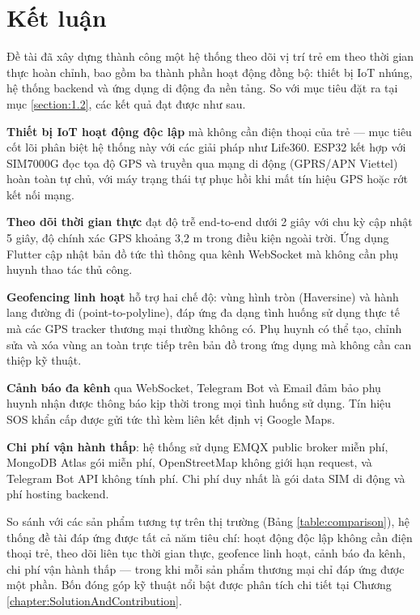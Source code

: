 \documentclass[../DoAn.tex]{subfiles}
\begin{document}
\section{Kết luận}
\label{section:6.1}

Đề tài đã xây dựng thành công một hệ thống theo dõi vị trí trẻ em theo thời gian thực hoàn chỉnh, bao gồm ba thành phần hoạt động đồng bộ: thiết bị IoT nhúng, hệ thống backend và ứng dụng di động đa nền tảng. So với mục tiêu đặt ra tại mục \ref{section:1.2}, các kết quả đạt được như sau.

\textbf{Thiết bị IoT hoạt động độc lập} mà không cần điện thoại của trẻ — mục tiêu cốt lõi phân biệt hệ thống này với các giải pháp như Life360. ESP32 kết hợp với SIM7000G đọc tọa độ GPS và truyền qua mạng di động (GPRS/APN Viettel) hoàn toàn tự chủ, với máy trạng thái tự phục hồi khi mất tín hiệu GPS hoặc rớt kết nối mạng.

\textbf{Theo dõi thời gian thực} đạt độ trễ end-to-end dưới 2 giây với chu kỳ cập nhật 5 giây, độ chính xác GPS khoảng 3,2 m trong điều kiện ngoài trời. Ứng dụng Flutter cập nhật bản đồ tức thì thông qua kênh WebSocket mà không cần phụ huynh thao tác thủ công.

\textbf{Geofencing linh hoạt} hỗ trợ hai chế độ: vùng hình tròn (Haversine) và hành lang đường đi (point-to-polyline), đáp ứng đa dạng tình huống sử dụng thực tế mà các GPS tracker thương mại thường không có. Phụ huynh có thể tạo, chỉnh sửa và xóa vùng an toàn trực tiếp trên bản đồ trong ứng dụng mà không cần can thiệp kỹ thuật.

\textbf{Cảnh báo đa kênh} qua WebSocket, Telegram Bot và Email đảm bảo phụ huynh nhận được thông báo kịp thời trong mọi tình huống sử dụng. Tín hiệu SOS khẩn cấp được gửi tức thì kèm liên kết định vị Google Maps.

\textbf{Chi phí vận hành thấp}: hệ thống sử dụng EMQX public broker miễn phí, MongoDB Atlas gói miễn phí, OpenStreetMap không giới hạn request, và Telegram Bot API không tính phí. Chi phí duy nhất là gói data SIM di động và phí hosting backend.

So sánh với các sản phẩm tương tự trên thị trường (Bảng \ref{table:comparison}), hệ thống đề tài đáp ứng được tất cả năm tiêu chí: hoạt động độc lập không cần điện thoại trẻ, theo dõi liên tục thời gian thực, geofence linh hoạt, cảnh báo đa kênh, chi phí vận hành thấp — trong khi mỗi sản phẩm thương mại chỉ đáp ứng được một phần. Bốn đóng góp kỹ thuật nổi bật được phân tích chi tiết tại Chương \ref{chapter:SolutionAndContribution}.
\end{document}
